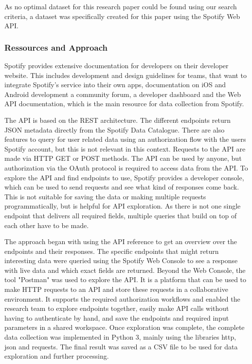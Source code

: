 As no optimal dataset for this research paper could be found using our search criteria,
a dataset was specifically created for this paper using the Spotify Web API.

\subsubsection{Ressources and Approach}

Spotify provides extensive documentation for developers on their developer website.\cite{SpotifyDev}
This includes development and design guidelines for teams, that want to integrate
Spotify's service into their own apps, documentation on iOS and Android development
a community forum, a developer dashboard and the Web API documentation, which is the main resource
for data collection from Spotify.

The \ac{API} is based on the \ac{REST} architecture. The different endpoints return \ac{JSON} metadata
directly from the Spotify Data Catalogue\cite{SpotifyWebAPI}. There are also features to query for
user related data using an authorization flow with the users Spotify account, but this is not relevant
in this context.\cite{SpotifyWebAPI} Requests to the \ac{API} are made via HTTP GET or POST methods.
The \ac{API} can be used by anyone, but authorization via the OAuth protocol is required to access data
from the \ac{API}. 
To explore the \ac{API} and find endpoints to use, Spotify provides a developer console, which can be used to 
send requests and see what kind of responses come back. This is not suitable for saving the data or making multiple
requests programmatically, but is helpful for API exploration. As there is not one single endpoint that delivers all
required fields, multiple queries that build on top of each other have to be made.

The approach began with using the \ac{API} reference to get an overview over the endpoints and their responses.
The specific endpoints that might return interesting data were queried using the Spotify Web Console to see
a response with live data and which exact fields are returned.
Beyond the Web Console, the tool "Postman" was used to explore the \ac{API}.
It is a platform that can be used to make HTTP requests to an API and store these requests in
a collaborative environment.\cite{PostmanWhatIs} It supports the required authorization workflows
and enabled the research team to explore endpoints together, easily make \ac{API} calls without having to
authenticate by hand, and save the endpoints and required input parameters in a shared workspace.
Once exploration was complete, the complete data collection was implemented in Python 3, mainly using the
libraries http, json and requests. The final result was saved as a CSV file to be used for data exploration
and further processing.

